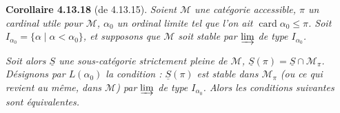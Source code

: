 \documentclass[11pt]{article}
\newcommand{\printedpage}[1]{\marginpar{\footnotesize p.~#1}}
\newcommand{\msp}[1]{\marginpar{\footnotesize [#1]}}
\newcommand{\card}{\operatorname{card}}
\begin{document}
\printedpage{128}

\msp{page 338}

\textbf{Corollaire 4.13.18} (de 4.13.15). \textit{Soient $\mathcal{M}$ une catégorie accessible, $\pi$ un cardinal utile pour $\mathcal{M}$, $\alpha_0$ un \textup{ordinal limite} tel que l'on ait $\card\alpha_0 \leqslant \pi$. Soit $I_{\alpha_0} = \{\alpha \mid \alpha < \alpha_0\}$, et supposons que $\mathcal{M}$ soit stable par $\varinjlim$ de type $I_{\alpha_0}$.}

\textit{Soit alors $\underline{S}$ une sous-catégorie strictement pleine de $\mathcal{M}$, $\underline{S}(\pi) = \underline{S}\cap\mathcal{M}_\pi$. Désignons par $L(\alpha_0)$ la condition : $\underline{S}(\pi)$ est stable dans $\mathcal{M}_\pi$ (ou ce qui revient au même, dans $\mathcal{M}$) par $\varinjlim$ de type $I_{\alpha_0}$. Alors les conditions suivantes sont équivalentes.}
\end{document}
